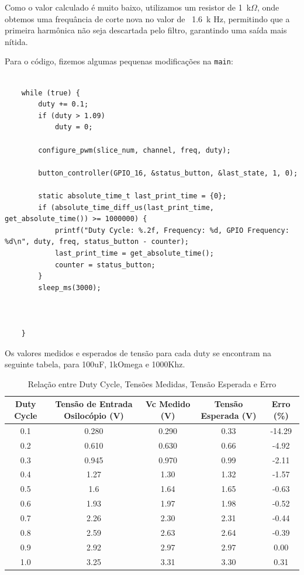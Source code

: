 \documentclass{article}
\begin{document}
Como o valor calculado é muito baixo, utilizamos um resistor de 1~k$\Omega$, onde obtemos uma frequância de corte nova no valor de ~1.6~k Hz, permitindo que a primeira harmônica não seja descartada pelo filtro, garantindo uma saída mais nítida.



Para o código, fizemos algumas pequenas modificações na \texttt{main}:

\begin{verbatim}
    
    while (true) {       
        duty += 0.1;
        if (duty > 1.09)
            duty = 0;
        
        configure_pwm(slice_num, channel, freq, duty);
        
        button_controller(GPIO_16, &status_button, &last_state, 1, 0);
        
        static absolute_time_t last_print_time = {0};
        if (absolute_time_diff_us(last_print_time, get_absolute_time()) >= 1000000) {
            printf("Duty Cycle: %.2f, Frequency: %d, GPIO Frequency: %d\n", duty, freq, status_button - counter);
            last_print_time = get_absolute_time();
            counter = status_button;
        }
        sleep_ms(3000);

    
        
    }
\end{verbatim}


Os valores medidos e esperados de tensão para cada duty se encontram na seguinte tabela, para 100uF, 1kOmega e 1000Khz.

\begin{table}[h!]
\centering
    \caption{Relação entre Duty Cycle, Tensões Medidas, Tensão Esperada e Erro}
    \begin{tabular}{|c|c|c|c|c|}
        \hline
        \textbf{Duty Cycle} & \textbf{Tensão de Entrada Osilocópio (V)} & \textbf{Vc Medido (V)} & \textbf{Tensão Esperada (V)} & \textbf{Erro (\%)} \\
        \hline
        0.1 & 0.280 & 0.290 & 0.33 & -14.29 \\
        0.2 & 0.610 & 0.630 & 0.66 & -4.92 \\
        0.3 & 0.945 & 0.970 & 0.99 & -2.11 \\
        0.4 & 1.27  & 1.30  & 1.32 & -1.57 \\
        0.5 & 1.6   & 1.64  & 1.65 & -0.63 \\
        0.6 & 1.93  & 1.97  & 1.98 & -0.52 \\
        0.7 & 2.26  & 2.30  & 2.31 & -0.44 \\
        0.8 & 2.59  & 2.63  & 2.64 & -0.39 \\
        0.9 & 2.92  & 2.97  & 2.97 & 0.00 \\
        1.0 & 3.25  & 3.31  & 3.30 & 0.31 \\
        \hline
    \end{tabular}
    \label{tab:duty_tensao}
\end{table}
\end{document}
